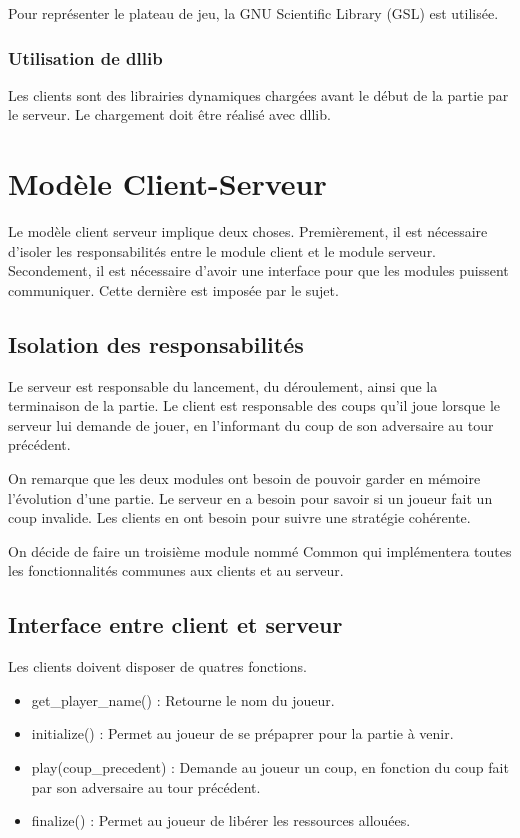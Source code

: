 \documentclass{article}
\begin{document}
Pour représenter le plateau de jeu, la GNU Scientific Library (GSL) est utilisée.

\subsubsection{Utilisation de dllib}

Les clients sont des librairies dynamiques chargées avant le début de la partie par le serveur.
Le chargement doit être réalisé avec dllib.

\section{Modèle Client-Serveur}

Le modèle client serveur implique deux choses.
Premièrement, il est nécessaire d'isoler les responsabilités entre le module client et le module serveur.
Secondement, il est nécessaire d'avoir une interface pour que les modules puissent communiquer.
Cette dernière est imposée par le sujet.

\subsection{Isolation des responsabilités}

Le serveur est responsable du lancement, du déroulement, ainsi que la terminaison de la partie.
Le client est responsable des coups qu'il joue lorsque le serveur lui demande de jouer, 
en l'informant du coup de son adversaire au tour précédent.

On remarque que les deux modules ont besoin de pouvoir garder en mémoire l'évolution d'une partie.
Le serveur en a besoin pour savoir si un joueur fait un coup invalide.
Les clients en ont besoin pour suivre une stratégie cohérente.

On décide de faire un troisième module nommé Common qui implémentera toutes les fonctionnalités communes 
aux clients et au serveur.

\subsection{Interface entre client et serveur}

Les clients doivent disposer de quatres fonctions.
\begin{itemize}
    \item get_player_name() : Retourne le nom du joueur.
    \item initialize() : Permet au joueur de se prépaprer pour la partie à venir.
    \item play(coup_precedent) : Demande au joueur un coup, en fonction 
    du coup fait par son adversaire au tour précédent.
    \item finalize() : Permet au joueur de libérer les ressources allouées.
\end{itemize}
\end{document}
